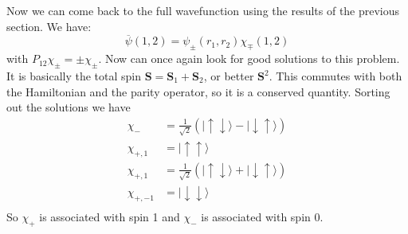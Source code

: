 \documentclass[10pt]{article}
\begin{document}
Now we can come back to the full wavefunction using the results of the previous section. We have:
\begin{equation}
\overline{\psi}(1,2) = \psi_{\pm}(r_1,r_2)\chi_\mp(1,2)
\end{equation}
with $P_{12}\chi_\pm = \pm \chi_\pm$. Now can once again look for good solutions to this problem. It is basically the total spin $\mathbf{S} = \mathbf{S}_1 + \mathbf{S}_2$, or better $\mathbf{S}^2$. This commutes with both the Hamiltonian and the parity operator, so it is a conserved quantity. Sorting out the solutions we have
\begin{align}
\chi_- &= \frac{1}{\sqrt{2}}\left(|\uparrow\downarrow\rangle - |\downarrow\uparrow\rangle\right)\\
\chi_{+,1} &= |\uparrow\uparrow\rangle \\
\chi_{+,1} &= \frac{1}{\sqrt{2}}\left(|\uparrow\downarrow\rangle + |\downarrow\uparrow\rangle\right) \\
\chi_{+,-1} &= |\downarrow\downarrow\rangle \\
\end{align}
So $\chi_+$ is associated with spin 1 and $\chi_-$ is associated with spin 0.

\FloatBarrier


\end{document}
